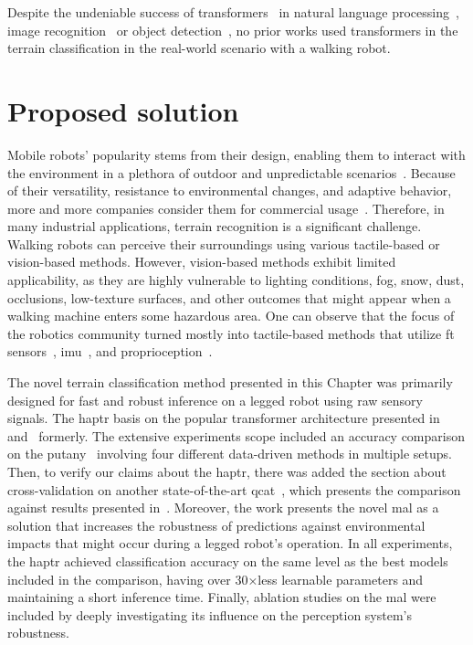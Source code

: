 \documentclass[a4paper, 10pt, twoside]{report}
\begin{document}
Despite the undeniable success of transformers~\cite{transformers} in natural language processing~\cite{GPT3}, image recognition~\cite{dosovitskiy2020image} or object detection~\cite{DETR}, no prior works used transformers in the terrain classification in the real-world scenario with a walking robot.

\section{Proposed solution}
\label{part:methods:terrain:solution}

Mobile robots' popularity stems from their design, enabling them to interact with the environment in a plethora of outdoor and unpredictable scenarios~\cite{Miki2022}. Because of their versatility, resistance to environmental changes, and adaptive behavior, more and more companies consider them for commercial usage~\cite{Spot, Agility, Ghost, AnymalC}. Therefore, in many industrial applications, terrain recognition is a significant challenge. Walking robots can perceive their surroundings using various tactile-based or vision-based methods. However, vision-based methods exhibit limited applicability, as they are highly vulnerable to lighting conditions, fog, snow, dust, occlusions, low-texture surfaces, and other outcomes that might appear when a walking machine enters some hazardous area. One can observe that the focus of the robotics community turned mostly into tactile-based methods that utilize \acrshort{ft} sensors~\cite{kolvenbach19, Walas2016}, \acrshort{imu}~\cite{Ahmadi2021}, and proprioception~\cite{Walas15a, Cheng2019}.

The novel terrain classification method presented in this Chapter was primarily designed for fast and robust inference on a legged robot using raw sensory signals. The \acrshort{haptr} basis on the popular transformer architecture presented in~\cite{transformers} and~\cite{dosovitskiy2020image} formerly. The extensive experiments scope included an accuracy comparison on the \acrfull{putany}~\cite{KubaRNN} involving four different data-driven methods in multiple setups. Then, to verify our claims about the \acrshort{haptr}, there was added the section about cross-validation on another state-of-the-art \acrfull{qcat}~\cite{QCAT}, which presents the comparison against results presented in~\cite{Ahmadi2021}. Moreover, the work presents the novel \acrshort{mal} as a solution that increases the robustness of predictions against environmental impacts that might occur during a legged robot's operation. In all experiments, the \acrshort{haptr} achieved classification accuracy on the same level as the best models included in the comparison, having over 30×less learnable parameters and maintaining a short inference time. Finally, ablation studies on the \acrshort{mal} were included by deeply investigating its influence on the perception system's robustness.
\end{document}
